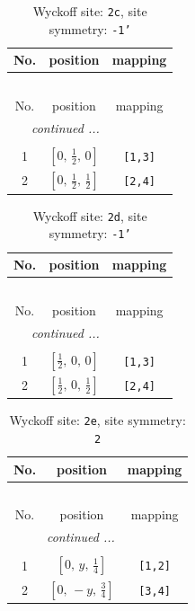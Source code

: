 \documentclass[fleqn,8pt]{jsarticle}
\begin{document}
\begin{longtable}{ccc}
\caption{Wyckoff site: {\tt 2c}, site symmetry: {\tt -1'}}
 \\
 \hline \hline
No. & position & mapping \\ \hline \endfirsthead

\multicolumn{2}{l}{\tablename\ \thetable{}} \\
 \hline \hline
No. & position & mapping \\ \hline \endhead

 \hline \hline
\multicolumn{2}{r}{\footnotesize\it continued ...} \\ \endfoot

 \hline \hline
\multicolumn{2}{r}{} \\ \endlastfoot

1 & $\left[ 0,\, \frac{1}{2},\, 0 \right]$ & {\tt [1,3]} \\ \hline
2 & $\left[ 0,\, \frac{1}{2},\, \frac{1}{2} \right]$ & {\tt [2,4]} \\
\end{longtable}
\renewcommand{\arraystretch}{1.2}
\begin{longtable}{ccc}
\caption{Wyckoff site: {\tt 2d}, site symmetry: {\tt -1'}}
 \\
 \hline \hline
No. & position & mapping \\ \hline \endfirsthead

\multicolumn{2}{l}{\tablename\ \thetable{}} \\
 \hline \hline
No. & position & mapping \\ \hline \endhead

 \hline \hline
\multicolumn{2}{r}{\footnotesize\it continued ...} \\ \endfoot

 \hline \hline
\multicolumn{2}{r}{} \\ \endlastfoot

1 & $\left[ \frac{1}{2},\, 0,\, 0 \right]$ & {\tt [1,3]} \\ \hline
2 & $\left[ \frac{1}{2},\, 0,\, \frac{1}{2} \right]$ & {\tt [2,4]} \\
\end{longtable}
\renewcommand{\arraystretch}{1.2}
\begin{longtable}{ccc}
\caption{Wyckoff site: {\tt 2e}, site symmetry: {\tt 2}}
 \\
 \hline \hline
No. & position & mapping \\ \hline \endfirsthead

\multicolumn{2}{l}{\tablename\ \thetable{}} \\
 \hline \hline
No. & position & mapping \\ \hline \endhead

 \hline \hline
\multicolumn{2}{r}{\footnotesize\it continued ...} \\ \endfoot

 \hline \hline
\multicolumn{2}{r}{} \\ \endlastfoot

1 & $\left[ 0,\, y,\, \frac{1}{4} \right]$ & {\tt [1,2]} \\ \hline
2 & $\left[ 0,\, - y,\, \frac{3}{4} \right]$ & {\tt [3,4]} \\
\end{longtable}
\end{document}
